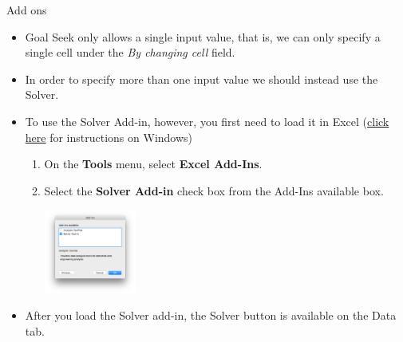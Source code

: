 \documentclass[xcolor=svgnames, handout]{beamer}
\begin{document}
\begin{frame}{Add ons}
\begin{itemize}
\item Goal Seek only allows a single input value, that is, we can only specify a single cell under the {\it By changing cell} field.
\medskip
\item In order to specify more than one input value we should instead use the Solver.
\medskip
\item To use the Solver Add-in, however, you first need to load it in Excel (\href{https://support.office.com/en-us/article/load-the-solver-add-in-in-excel-612926fc-d53b-46b4-872c-e24772f078ca\#OfficeVersion=Windows}{click here} for instructions on Windows)

\begin{enumerate}
\item On the {\bf Tools} menu, select {\bf Excel Add-Ins}.
\item Select the {\bf Solver Add-in} check box from the Add-Ins available box.
\begin{center}
\includegraphics[width=0.25\textwidth]{solveraddin}
\end{center}



\end{enumerate}
\item After you load the Solver add-in, the Solver button is available on the Data tab.
\end{itemize}
\end{frame}
\end{document}
